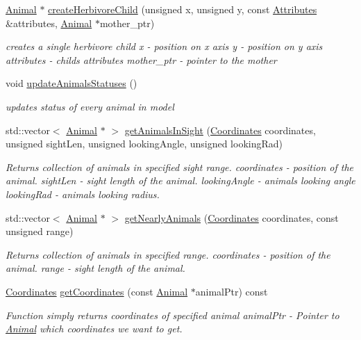 \begin{DoxyCompactItemize}
\hyperlink{class_animal}{Animal} $\ast$ \hyperlink{class_model_ac9ba85cbab8df278ed7ce0970f2b3b75}{create\+Herbivore\+Child} (unsigned x, unsigned y, const \hyperlink{class_attributes}{Attributes} \&attributes, \hyperlink{class_animal}{Animal} $\ast$mother\+\_\+ptr)
\begin{DoxyCompactList}\small\item\em creates a single herbivore child  x -\/ position on x axis  y -\/ position on y axis  attributes -\/ child\textquotesingle{}s attributes  mother\+\_\+ptr -\/ pointer to the mother \end{DoxyCompactList}\item 
void \hyperlink{class_model_aa2d52c9896f6ddc7550f80a05a79d5c6}{update\+Animals\+Statuses} ()
\begin{DoxyCompactList}\small\item\em updates status of every animal in model \end{DoxyCompactList}\item 
std\+::vector$<$ \hyperlink{class_animal}{Animal} $\ast$ $>$ \hyperlink{class_model_af7bef4dc55f369d9183f2539cf967f3a}{get\+Animals\+In\+Sight} (\hyperlink{struct_coordinates}{Coordinates} coordinates, unsigned sight\+Len, unsigned looking\+Angle, unsigned looking\+Rad)
\begin{DoxyCompactList}\small\item\em Returns collection of animals in specified sight range.  coordinates -\/ position of the animal.  sight\+Len -\/ sight length of the animal.  looking\+Angle -\/ animal\textquotesingle{}s looking angle  looking\+Rad -\/ animal\textquotesingle{}s looking radius. \end{DoxyCompactList}\item 
std\+::vector$<$ \hyperlink{class_animal}{Animal} $\ast$ $>$ \hyperlink{class_model_a8bfdd563b3481f4a09aa453a82aeb03d}{get\+Nearly\+Animals} (\hyperlink{struct_coordinates}{Coordinates} coordinates, const unsigned range)
\begin{DoxyCompactList}\small\item\em Returns collection of animals in specified range.  coordinates -\/ position of the animal.  range -\/ sight length of the animal. \end{DoxyCompactList}\item 
\hyperlink{struct_coordinates}{Coordinates} \hyperlink{class_model_a3e2a7c4c9f8615681bb125d753ce096b}{get\+Coordinates} (const \hyperlink{class_animal}{Animal} $\ast$animal\+Ptr) const 
\begin{DoxyCompactList}\small\item\em Function simply returns coordinates of specified animal  animal\+Ptr -\/ Pointer to \hyperlink{class_animal}{Animal} which coordinates we want to get. \end{DoxyCompactList}\item 

\end{DoxyCompactItemize}
